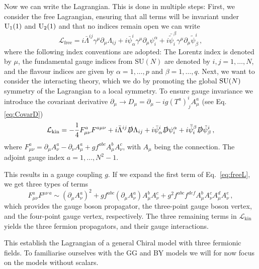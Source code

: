 Now we can write the Lagrangian. This is done in multiple steps: First, we consider the free Lagrangian, ensuring that all terms will be invariant under $\mathrm{U}_1(1)$ and $\mathrm{U}_2(1)$ and that no indices remain open we can write
\begin{equation}
    \mathcal{L}_{\text{free}}= i \bar \Lambda^{ij}\gamma^\mu \partial_\mu\Lambda_{ij}+i \bar \psi^i_\alpha\gamma^\mu \partial_\mu\psi_i^\alpha+i \bar {\tilde{\psi}}_i^\beta\gamma^\mu \partial_\mu{\tilde{\psi}}^i_\beta\,,
\end{equation}
where the following index conventions are adopted: The Lorentz index is denoted by $\mu$, the fundamental gauge indices from $\mathrm{SU}(N)$ are denoted by $i,j=1,\dots,N$, and the flavour indices are given by $\alpha=1,\dots, p$ and $\beta=1,\dots,q$. Next, we want to consider the interacting theory, which we do by promoting the global $\mathrm{SU}(N)$ symmetry of the Lagrangian to a local symmetry. To ensure gauge invariance we introduce the covariant derivative $\partial_\mu \to D_\mu= \partial_\mu - ig(T^a)^i_{\,j}A_\mu^a$ (see Eq. \eqref{eq:CovarD})
\begin{equation}
    \mathcal{L}_{\text{kin}}= -\frac{1}{4} F_{\mu\nu}^a F^{a\mu\nu}+ i \bar{\Lambda}^{ij} \slashed{D} \Lambda_{ij} 
    + i \bar{\psi}^i_\alpha \slashed{D} \psi_i^\alpha 
    + i \bar{\tilde{\psi}}_i^\beta \slashed{D} \tilde{\psi}^i_\beta \,,\label{eq:freeL}
\end{equation}
where $F_{\mu\nu}^a=\partial_\mu A_\nu^a-\partial_\nu A_\mu ^a+g f^{abc}A_\mu^bA_\nu^c$, with $A_\mu$ being the connection. The adjoint gauge index $a=1,\dots,N^2-1$. 

This results in a gauge coupling $g$. If we expand the first term of Eq.~\ref{eq:freeL}, we get three types of terms
\begin{equation}
    F_{\mu\nu}^a F^{\mu\nu\,a}\sim(\partial_\mu A_\nu^a)^2+ g f^{abc}(\partial_\mu A_\nu^a)A_\mu^bA_\nu^c +g^2 f^{abc}f^{def}A_\mu^bA_\nu^cA_\mu^dA_\nu^e\,,\label{eq:generalL}
\end{equation}
which provides the gauge boson propagator, the three-point gauge boson vertex, and the four-point gauge vertex, respectively. The three remaining terms in $\mathcal{L}_{\text{kin}}$ yields the three fermion propagators, and their gauge interactions. 

This establish the Lagrangian of a general Chiral model with three fermionic fields. To familiarise ourselves with the GG and BY models we will for now focus on the models without scalars.

